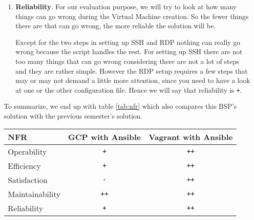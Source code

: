 \begin{enumerate}
	\item \textbf{Reliability}.  For our evaluation purpose, we will
	try to look at how many things can go wrong during the Virtual
	Machine creation. So the fewer things there are that can go wrong,
	the more reliable the solution will be.

	Except for the two steps in setting up SSH and RDP nothing can
	really go wrong because the script handles the rest. For setting
	up SSH there are not too many things that can go wrong considering
	there are not a lot of steps and they are rather simple. However
	the RDP setup requires a few steps that may or may not demand a
	little more attention, since you need to have a look at one or the
	other configuration file. Hence we will say that reliability is
	\verb|+|.

\end{enumerate}

To summarize, we end up with table \ref{tab:nfr} which also compares
this BSP's solution with the previous semester's solution.

\begin{table}
	\begin{tabular}{l||cc}
		NFR              & GCP with Ansible & Vagrant with Ansible \\\hline
		Operability      &   \verb|+|       &    \verb|++| \\
		Efficiency       &   \verb|+|       &    \verb|++| \\
		Satisfaction     &   \verb|-|       &    \verb|++| \\
		Maintainability  &   \verb|++|      &    \verb|++| \\
		Reliability      &   \verb|+|       &    \verb|++| \\
	\end{tabular}
\end{table}
